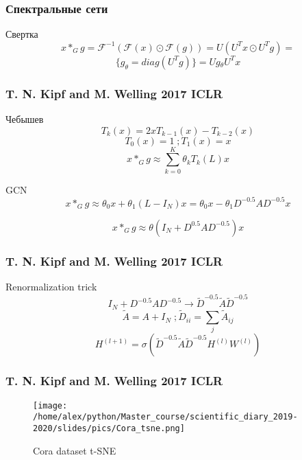 \documentclass[fleqn, xcolor=x11names]{beamer}
\begin{document}
\begin{frame}\frametitle{Спектральные сети}

\begin{block}{Свертка}
$$ x *_{G} g = \mathcal{F}^{-1}(\mathcal{F}(x)\odot\mathcal{F}(g))=U(U^Tx\odot U^Tg) =$$
$$ \{g_{\theta}=diag(U^Tg)\}=Ug{_\theta}U^Tx$$
\end{block}

\end{frame}

\begin{frame}\frametitle{T. N. Kipf and M. Welling 2017 ICLR
}

\begin{block}{Чебышев}
$$ T_k(x) = 2 x T_{k-1}(x) - T_{k-2}(x)$$
$$T_0(x) = 1\;; T_1(x) = x$$
$$ x *_{G} g \approx \sum \limits_{k=0}^{K} \theta_k T_k(L)x $$
\end{block}

\begin{block}{GCN}
$$ x *_{G} g \approx \theta_0 x + \theta_1 (L-I_N)x=\theta_0 x-\theta_1 D^{-0.5}AD^{-0.5} x$$

$$ x *_{G} g \approx \theta(I_N + D^{0.5}AD^{-0.5})x $$
\end{block}

\end{frame}

\begin{frame}\frametitle{T. N. Kipf and M. Welling 2017 ICLR}

\begin{block}{Renormalization trick}
$$ I_N + D^{-0.5}AD^{-0.5} \rightarrow \tilde{D}^{-0.5}\tilde{A}\tilde{D}^{-0.5} $$
$$ \tilde{A} = A+I_N\; ; \tilde{D}_{ii} = \sum_j\tilde{A}_{ij}$$
$$ H^{(l+1)} = \sigma(	\tilde{D}^{-0.5}\tilde{A}\tilde{D}^{-0.5}H^{(l)}W^{(l)})$$
\end{block}

\end{frame}

\begin{frame}\frametitle{T. N. Kipf and M. Welling 2017 ICLR}

\begin{figure}[h]
\begin{center}
\texttt{[image: /home/alex/python/Master\_course/scientific\_diary\_2019-2020/slides/pics/Cora\_tsne.png]}
\caption{Cora dataset t-SNE}
\end{center}
\end{figure}

\end{frame}
\end{document}

